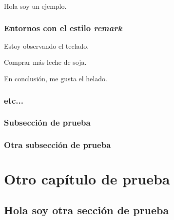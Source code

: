 \begin{example}
Hola soy un ejemplo.
\end{example}



\subsection{Entornos con el estilo \textit{remark}}

\begin{remark}[Observación]
Estoy observando el teclado.
\end{remark}

\begin{note}
Comprar más leche de soja.
\end{note}
\begin{conclusion}
En conclusión, me gusta el helado.
\end{conclusion}


\subsection{etc...}
\lipsum[4-7]



\subsection{Subsección de prueba}
\lipsum[8]
\subsection{Otra subsección de prueba}
\lipsum[9-20]
\chapter{Otro capítulo de prueba}
\lipsum[10]
\section{Hola soy otra sección de prueba}
\lipsum[11-40]